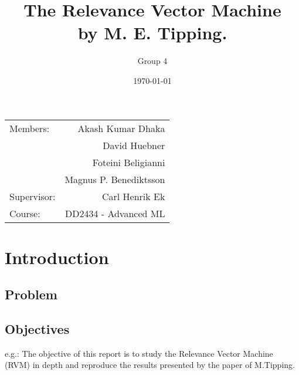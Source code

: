 \documentclass{article}
\title{ The Relevance Vector Machine \\ by M. E. Tipping.} %
\author{Group \textsc{4}} %
\date{\today} %
\begin{document}
\maketitle %

\begin{center}
\begin{tabular}{l r}
Members: & Akash Kumar Dhaka \\%
& David Huebner \\
& Foteini Beligianni \\ 
& Magnus P. Benediktsson \\

Supervisor: & Carl Henrik Ek \\%
Course: & DD2434 - Advanced ML
\end{tabular}
\end{center}



\section{Introduction}





\subsection{Problem}
\label{Problem} %
\subsection{Objectives}
\label{Objectives} 
e.g.: The objective of this report is to study the Relevance Vector Machine (RVM) in depth and reproduce the results presented by the paper 
of M.Tipping\cite{Tipping2000}.
\end{document}
